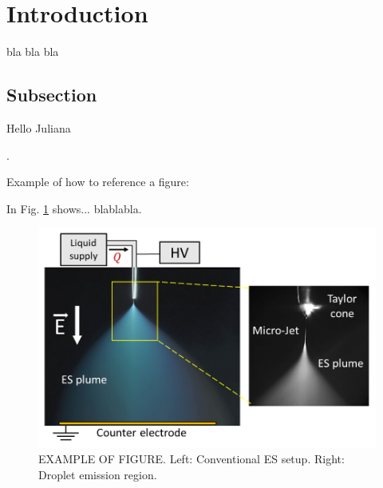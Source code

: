 \documentclass[oneside,12pt]{article}
\begin{document}
\setlength{\parindent}{0 em}  %
\setlength{\parskip}{0.7 em}    %

\newpage    \pagestyle{empty}
\tableofcontents
\pagestyle{fancy}



\newpage
\section{Introduction}

bla bla bla







\subsection{Subsection}

Hello Juliana 

 \citep{Carrasco-Munoz2022}. %

Example of how to reference a figure:

In Fig. \ref{fig:ES_intro} shows... blablabla. %

\begin{figure}[h!]
    \centering
    \includegraphics[width=.8\textwidth,trim=1 1 1 1,clip]{figures/Example.png}
    \caption{EXAMPLE OF FIGURE. Left: Conventional ES setup. Right: Droplet emission region.}
    \label{fig:ES_intro}
\end{figure}
\end{document}
